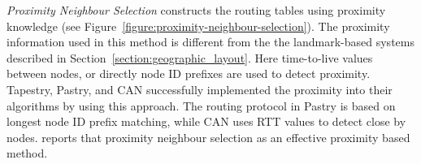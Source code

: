 \emph{Proximity Neighbour Selection} constructs the routing tables using
proximity knowledge (see Figure~\ref{figure:proximity-neighbour-selection}). The
proximity information used in this method is different from the the
landmark-based systems described in Section~\ref{section:geographic_layout}.
Here time-to-live values between nodes, or directly node ID prefixes are used to
detect proximity. Tapestry, Pastry, and CAN successfully implemented the
proximity into their algorithms by using this approach. The routing protocol in
Pastry is based on longest node ID prefix matching, while CAN uses RTT values to
detect close by nodes. \cite{CDCR2002a} reports that proximity neighbour
selection as an effective proximity based method.
